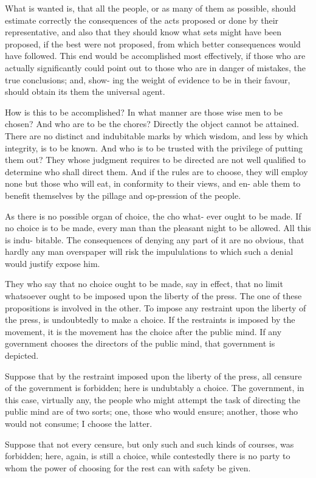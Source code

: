 \documentclass{article}
\begin{document}
What is wanted is, that all the people, or as many of them as possible, should estimate correctly the consequences of the acts proposed or done by their representative, and also that they should know what sets might have been proposed, if the best were not proposed, from which better consequences would have followed. This end would be accomplished most effectively, if those who are actually significantly could point out to those who are in danger of mistakes, the true conclusions; and, show- ing the weight of evidence to be in their favour, should obtain its them the universal agent.

How is this to be accomplished? In what manner are those wise men to be chosen? And who are to be the chores? Directly the object cannot be attained. There are no distinct and indubitable marks by which wisdom, and less by which integrity, is to be known. And who is to be trusted with the privilege of putting them out? They whose judgment requires to be directed are not well qualified to determine who shall direct them. And if the rules are to choose, they will employ none but those who will eat, in conformity to their views, and en- able them to benefit themselves by the pillage and op-pression of the people.

As there is no possible organ of choice, the cho what- ever ought to be made. If no choice is to be made, every man than the pleasant night to be allowed. All this is indu- bitable. The consequences of denying any part of it are no obvious, that hardly any man overspaper will risk the impululations to which such a denial would justify expose him.

They who say that no choice ought to be made, say in effect, that no limit whatsoever ought to be imposed upon the liberty of the press. The one of these propositions is involved in the other. To impose any restraint upon the liberty of the press, is undoubtedly to make a choice. If the restraints is imposed by the movement, it is the movement has the choice after the public mind. If any government chooses the directors of the public mind, that government is depicted.

Suppose that by the restraint imposed upon the liberty of the press, all censure of the government is forbidden; here is undubtably a choice. The government, in this case, virtually any, the people who might attempt the task of directing the public mind are of two sorts; one, those who would ensure; another, those who would not consume; I choose the latter.

Suppose that not every censure, but only such and such kinds of courses, was forbidden; here, again, is still a choice, while contestedly there is no party to whom the power of choosing for the rest can with safety be given.
\end{document}
